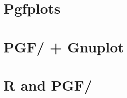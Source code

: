 \documentclass[DIV         = 12,
               fontsize    = 10,
               headinclude = false,
               index       = totoc,
               footinclude = false,
               twoside,
			   totoc,
               headings    = small]{tkz-doc}
\begin{document}
\clearpage
\section{Pgfplots} %
\label{sec:pgfplots}



\clearpage
\section{PGF/\TIKZ{} + Gnuplot} %
\label{sec:pgf_tikz_gnuplot}



\clearpage
\section{R and PGF/\TIKZ{}} %
\label{sec:r_and_pgf_tikz}


\clearpage\newpage 
\makeatletter

\printindex
\end{document}
